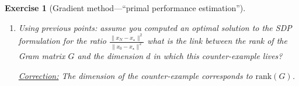 \documentclass[11pt,a4paper]{article}
\newcommand{\correction}[1]{{{\color{blue}\underline{Correction:} #1}}}
\newcommand{\correction}[1]{}
\newtheorem{exercise}{Exercise}
\begin{document}
\begin{exercise}[Gradient method---``primal performance estimation'']
\begin{enumerate}
	\correction{ Following the same steps, we arrive to \begin{equation*}
		\begin{aligned}
		\sup_{\substack{d\\x_0,x_1,\ldots,x_{N},x_\star\\g_0,g_{1},\ldots,g_{N-1},g_\star\\f_k,f_{k+1},f_\star}} \quad & \|x_N-x_\star\|^2\\
		\text{s.t. } & \exists f\in\mathcal{F}_{\mu,L} \text{ such that }\left\{\begin{array}{ll}
			f_i=f(x_i)\quad & i=0,1,\ldots,N-1,\star\\
			g_i=\nabla f(x_i)\quad & i=0,1,\ldots,N-1,\star
			\end{array}\right.\\
		& x_{i+1}=x_i-\gamma_i  g_i \quad i=0,1,\ldots,N-1\\
		& \|x_0-x_\star\|^2= 1\\
		& g_\star=0.\\
		\end{aligned}
		\end{equation*}
	This formulation naturally translates to a $(N+1)\times (N+1)$ SDP with
			\begin{align*}
			P &\triangleq [x_0-x_\star,\, g_0,\, g_1,\,\ldots,\,g_{N-1}],\, G \triangleq P^{\top\!}P\succcurlyeq0,\\ F &\triangleq 			[f_0-f_\star,\, f_{1}-f_\star,\, f_{N-1}-f_\star].
			\end{align*}
	along with $N(N+1)$ interpolation inequalities (two inequalities per pair of points in the discrete representation). As a validation test for your code, using any constant stepsize rule $\gamma_k=\gamma$ should lead to a worst-case ratio equal to $ \left(\max\{(1-\gamma_k L)^2,(1-\gamma_k\mu)^2\}\right)^n$}
	
	\item Using previous points: assume you computed an optimal solution to the SDP formulation for the ratio $\frac{\|x_{N}-x_\star\|^2}{\|x_0-x_\star\|^2}$ what is the link between the rank of the Gram matrix $G$ and the dimension $d$ in which this counter-example lives? 
	
	\correction{The dimension of the counter-example corresponds to $\mathrm{rank}(G)$.}
	

\end{enumerate}
\end{exercise}
\end{document}
